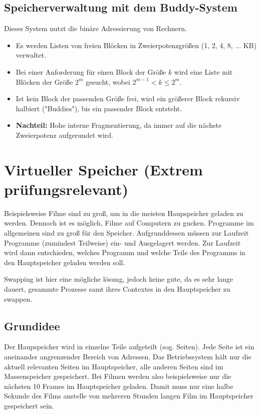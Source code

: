 \subsection{Speicherverwaltung mit dem Buddy-System}
Dieses System nutzt die binäre Adressierung von Rechnern.
\begin{itemize}
    \item Es werden Listen von freien Blöcken in Zweierpotenzgrößen (1, 2, 4, 8, ... KB)
          verwaltet.
    \item Bei einer Anforderung für einen Block der Größe $k$ wird eine Liste mit Blöcken
          der Größe $2^m$ gesucht, wobei $2^{m-1} < k \le 2^m$.
    \item Ist kein Block der passenden Größe frei, wird ein größerer Block rekursiv
          halbiert ("Buddies"), bis ein passender Block entsteht.
    \item \textbf{Nachteil:} Hohe interne Fragmentierung, da immer auf die nächste Zweierpotenz aufgerundet wird.
\end{itemize}

\section{Virtueller Speicher (Extrem prüfungsrelevant)}

Beispielsweise Filme sind zu groß, um in die meisten Haupspeicher geladen zu
werden. Dennoch ist es möglich, Filme auf Computern zu gucken. Programme im
allgemeinen sind zu groß für den Speicher. Aufgrunddessen müssen zur Laufzeit
Programme (zumindest Teilweise) ein- und Ausgelagert werden. Zur Laufzeit wird
dann entschieden, welches Programm und welche Teile des Programms in den
Hauptspeicher geladen werden soll.

Swapping ist hier eine mögliche lösung, jedoch keine gute, da es sehr lange
dauert, gesammte Prozesse samt ihres Contextes in den Hauptspeicher zu swappen.

\subsection{Grundidee}

Der Haupspeicher wird in einzelne Teile aufgeteilt (sog. Seiten). Jede Seite
ist ein aneinander angrenzender Bereich von Adressen. Das Betriebssystem hält
nur die aktuell relevanten Seiten im Hauptspeicher, alle anderen Seiten sind im
Massenspeicher gespeichert. Bei Filmen werden also beispielsweise nur die
nächsten 10 Frames im Hauptspeicher geladen. Damit muss nur eine halbe Sekunde
des Films anstelle von mehreren Stunden langen Film im Hauptspeicher
gespeichert sein.

